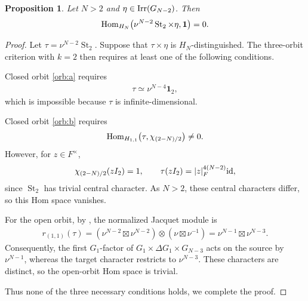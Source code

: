 \documentclass[11pt,leqno]{amsart}
\numberwithin{equation}{section}
\theoremstyle{plain}
\newtheorem{proposition}[theorem]{Proposition}
\theoremstyle{definition}
\theoremstyle{remark}
\newcommand{\one}{\mathbf{1}}
\begin{document}
	\begin{proposition}\label{lem:steinberg}
		Let $N>2$ and $\eta\in {\rm Irr}(G_{N-2})$. Then
		\begin{align*}
			{\rm Hom}_{H_N}
			\bigl(\nu^{N-2}\operatorname{St}_2\times\eta,\one \bigr)=0.
		\end{align*}
	\end{proposition}
	\begin{proof}
		Let $\tau=\nu^{N-2}\operatorname{St}_2$.
		Suppose that $\tau\times\eta$ is $H_N$-distinguished.
		The three-orbit criterion with $k=2$ then requires at least
		one of the following conditions.
		
		Closed orbit \ref{orb:a} requires
		\begin{align*}
			\tau\simeq\nu^{N-4}\mathbf1_2,
		\end{align*}
		which is impossible because $\tau$ is infinite-dimensional.
		
		Closed orbit \ref{orb:b} requires
		\begin{align*}
			{\rm Hom}_{H_{1,1}}
			\bigl(\tau,\chi_{(2-N)/2}\bigr)\neq0.
		\end{align*}
		However, for $z\in F^\times$,
		\begin{align*}
			\chi_{(2-N)/2}(zI_2)=1,
			\qquad
			\tau(zI_2)=|z|_F^{4(N-2)}{\rm id},
		\end{align*}
		since \(\operatorname{St}_2\) has trivial central character.
		As \(N>2\), these central characters differ, so this Hom
		space vanishes.
		
		For the open orbit, by  \cite[Proposition 4.10]{MS13}, the normalized Jacquet module is
		\begin{align*}
			r_{(1,1)}(\tau)=(\nu^{N-2}\boxtimes\nu^{N-2}) \otimes(\nu\boxtimes\nu^{-1})=\nu^{N-1}\boxtimes\nu^{N-3}.
		\end{align*}
		Consequently, the first $G_1$-factor of
		$G_1\times\Delta G_1\times G_{N-3}$ acts on the source
		by $\nu^{N-1}$, whereas the target character restricts
		to $\nu^{N-3}$. These characters are distinct, so the open-orbit Hom space is trivial.
		
		Thus none of the three necessary conditions holds, we complete the proof.
	\end{proof}
	
\end{document}
